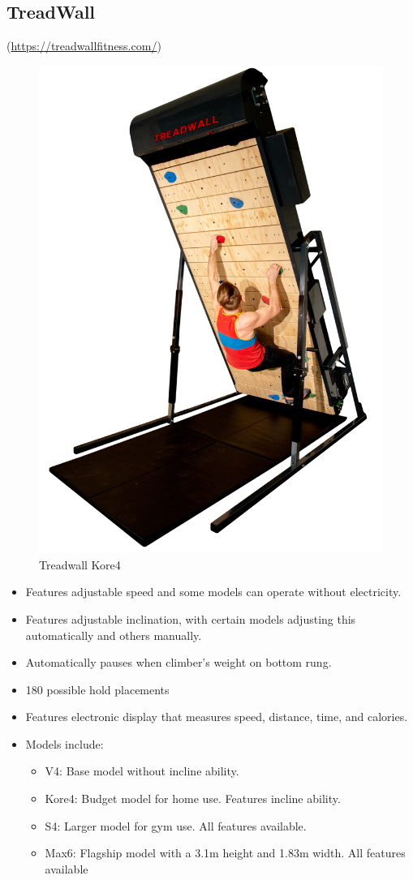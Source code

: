 \subsection{TreadWall}
(\url{https://treadwallfitness.com/})
\begin{figure}[H]
    \centering
    \includegraphics[width=0.5\linewidth]{figs/treadwall_kore4.png}
    \caption{Treadwall Kore4}
\end{figure}
    \begin{itemize}
        \item Features adjustable speed and some models can operate without electricity.
        \item Features adjustable inclination, with certain models adjusting this automatically and others manually.
        \item Automatically pauses when climber's weight on bottom rung.
        \item 180 possible hold placements
        \item Features electronic display that measures speed, distance,  time, and calories.
        \item Models include:
        \begin{itemize}
            \item V4: Base model without incline ability.
            \item Kore4: Budget model for home use. Features incline ability.
            \item S4: Larger model for gym use. All features available.
            \item Max6: Flagship model with a 3.1m height and 1.83m width. All features available
        \end{itemize}
        
    \end{itemize}

